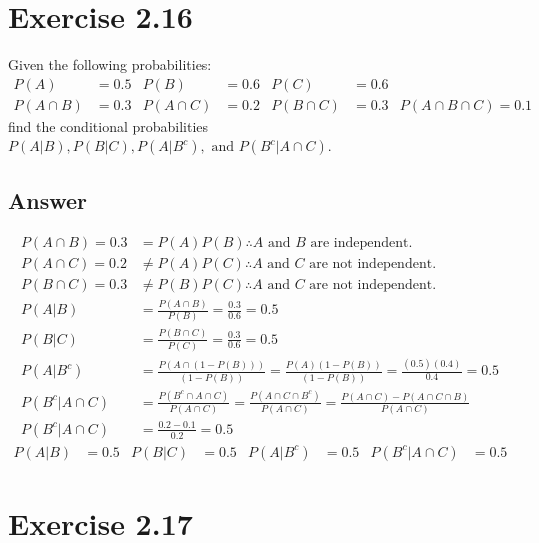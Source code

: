 \documentclass{article}
\begin{document}
	\section*{Exercise 2.16}
	
	Given the following probabilities:
	\begin{align*}
	P(A) &= 0.5 & P(B)&= 0.6 & P(C) &= 0.6 \\
	P(A\cap B) &= 0.3 & P(A\cap C) &= 0.2 & P(B\cap C) &= 0.3 & P(A\cap B \cap C) = 0.1
	\end{align*}
	find the conditional probabilities $P(A|B), P(B|C), P(A|B^c), \text{ and } P(B^c| A\cap C)$.
	
	\subsection*{Answer}
	\begin{align*}
		P(A\cap B ) = 0.3 &= P(A)P(B) \therefore A \text{ and } B \text{ are independent.}\\
		P(A\cap C ) = 0.2 &\not = P(A)P(C) \therefore A \text{ and } C \text{ are not independent.}\\
		P(B\cap C ) = 0.3 &\not = P(B)P(C) \therefore A \text{ and } C \text{ are not independent.}\\
		P(A|B) &= \frac{P(A\cap B)}{P(B)} = \frac{0.3}{0.6} = 0.5 \\
		P(B|C) &= \frac{P(B\cap C)}{P(C)} = \frac{0.3}{0.6} = 0.5 \\
		P(A|B^c) &= \frac{P(A\cap (1-P(B)))}{(1-P(B))} = \frac{P(A)(1-P(B))}{(1-P(B))} = \frac{(0.5)(0.4)}{0.4} = 0.5 \\
		P(B^c| A\cap C) &= \frac{P(B^c \cap A \cap C)}{P(A \cap C)} = \frac{P(A \cap C \cap B^c)}{P(A\cap C)} = \frac{P(A \cap C) - P(A \cap C \cap B)}{P(A \cap C)}\\
		P(B^c| A\cap C) &= \frac{0.2 - 0.1}{0.2} = 0.5
	\end{align*}
	\begin{align*}
		P(A|B) &= 0.5 & P(B|C) &= 0.5 & P(A|B^c) &= 0.5 & P(B^c| A\cap C) &= 0.5
	\end{align*}
	\section*{Exercise 2.17}
	
\end{document}
